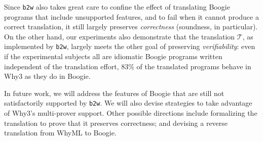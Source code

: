 \documentclass[a4paper,final]{llncs}
\newif\iflong
\newcommand{\tr}{\mathcal{T}}
\newcommand{\btw}{\texttt{b2w}\xspace}
\newcommand{\Boogie}{Boogie\xspace}
\newcommand{\WhyML}{WhyML\xspace}
\newcommand{\Why}{Why3\xspace}
\begin{document}
Since \btw also takes great care to confine the effect of translating \Boogie programs that include unsupported features, and to fail when it cannot produce a correct translation, it still largely preserves \emph{correctness} (soundness, in particular).
\iflong
For example, a \B{goto} statement is rendered as \B{assert false}; therefore, the translated program verifies only if the \B{goto} is never executed in the original program, which ensures soundness.
\fi{}
On the other hand, our experiments also demonstrate that the translation $\tr$, as implemented by \btw, largely meets the other goal of preserving \emph{verifiability}: even if the experimental subjects all are idiomatic \Boogie programs written independent of the translation effort, 83\% of the translated programs behave in \Why as they do in \Boogie.

In future work, we will address the features of \Boogie that are still not satisfactorily supported by \btw.
We will also devise strategies to take advantage of \Why's multi-prover support.
Other possible directions include formalizing the translation to prove that it preserves correctness; and devising a reverse translation from \WhyML to \Boogie.
\end{document}
